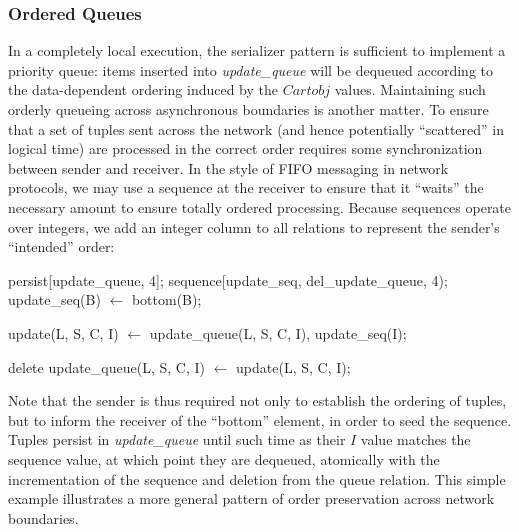\begin{comment}
In this example, deductive rules that depend on \dedalus{priority\_queue\_out}
are constrained to consider only min-priority tuples at each timestep per value
of the variable \dedalus{A}, thus implementing a per-user FIFO discipline.  To
enforce a FIFO ordering over all users, we may remove the \dedalus{A} column
from \dedalus{omin}.


By doing so, we take advantage of the monotonic property of timestamps to enforce an ordering property over our input that is otherwise 
very difficult to express in a logic language.

\end{comment}
\subsubsection{Ordered Queues}

In a completely local execution, the serializer pattern is sufficient to implement a
priority queue:  items inserted into {\em update\_queue} will be dequeued 
according to the data-dependent ordering induced by the $Cartobj$ values.
Maintaining such orderly queueing across asynchronous boundaries is another
matter.  To ensure that a set of tuples sent across the network (and hence potentially 
``scattered'' in logical time) are processed in the correct order requires some synchronization
between sender and receiver.  In the style of FIFO messaging in network protocols, 
we may use a sequence at the receiver to ensure that it ``waits'' 
the necessary amount  to ensure totally ordered processing.  Because
sequences operate over integers, we add an integer column to all relations to represent 
the sender's ``intended'' order:

\begin{Dedalus}
persist[update_queue, 4];
sequence[update_seq, del_update_queue, 4);
update_seq(B) \(\leftarrow\) bottom(B);

update(L, S, C, I) \(\leftarrow\)
  update_queue(L, S, C, I),
  update_seq(I);

delete update_queue(L, S, C, I) \(\leftarrow\)
  update(L, S, C, I);
\end{Dedalus}

Note that the sender is thus required not only to establish the ordering of tuples, but
to inform the receiver of the ``bottom'' element, in order to seed the sequence.
Tuples persist in {\em update\_queue} until such time as their $I$ value matches the 
sequence value, at which point they are dequeued, atomically with the incrementation
of the sequence and deletion from the queue relation.  This simple example illustrates
a more general pattern of order preservation across network boundaries.

